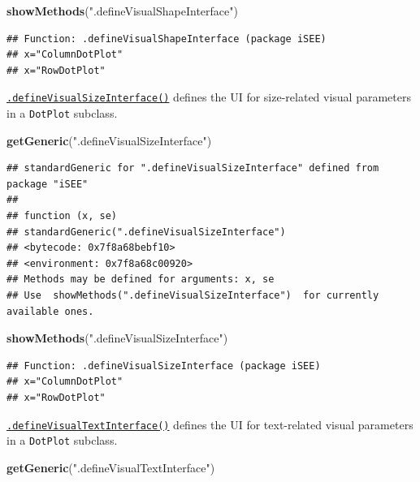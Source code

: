 \documentclass[
]{book}
\newenvironment{Shaded}{\begin{snugshade}}{\end{snugshade}}
\newcommand{\KeywordTok}[1]{\textcolor[rgb]{0.13,0.29,0.53}{\textbf{#1}}}
\newcommand{\NormalTok}[1]{#1}
\newcommand{\StringTok}[1]{\textcolor[rgb]{0.31,0.60,0.02}{#1}}
\begin{document}
\begin{Shaded}
\begin{Highlighting}[]
\KeywordTok{showMethods}\NormalTok{(}\StringTok{".defineVisualShapeInterface"}\NormalTok{)}
\end{Highlighting}
\end{Shaded}

\begin{verbatim}
## Function: .defineVisualShapeInterface (package iSEE)
## x="ColumnDotPlot"
## x="RowDotPlot"
\end{verbatim}

\href{https://isee.github.io/iSEE/reference/visual-parameters-generics.html}{\texttt{.defineVisualSizeInterface()}} defines the UI for size-related visual parameters in a \texttt{DotPlot} subclass.

\begin{Shaded}
\begin{Highlighting}[]
\KeywordTok{getGeneric}\NormalTok{(}\StringTok{".defineVisualSizeInterface"}\NormalTok{)}
\end{Highlighting}
\end{Shaded}

\begin{verbatim}
## standardGeneric for ".defineVisualSizeInterface" defined from package "iSEE"
## 
## function (x, se) 
## standardGeneric(".defineVisualSizeInterface")
## <bytecode: 0x7f8a68bebf10>
## <environment: 0x7f8a68c00920>
## Methods may be defined for arguments: x, se
## Use  showMethods(".defineVisualSizeInterface")  for currently available ones.
\end{verbatim}

\begin{Shaded}
\begin{Highlighting}[]
\KeywordTok{showMethods}\NormalTok{(}\StringTok{".defineVisualSizeInterface"}\NormalTok{)}
\end{Highlighting}
\end{Shaded}

\begin{verbatim}
## Function: .defineVisualSizeInterface (package iSEE)
## x="ColumnDotPlot"
## x="RowDotPlot"
\end{verbatim}

\href{https://isee.github.io/iSEE/reference/visual-parameters-generics.html}{\texttt{.defineVisualTextInterface()}} defines the UI for text-related visual parameters in a \texttt{DotPlot} subclass.

\begin{Shaded}
\begin{Highlighting}[]
\KeywordTok{getGeneric}\NormalTok{(}\StringTok{".defineVisualTextInterface"}\NormalTok{)}
\end{Highlighting}
\end{Shaded}
\end{document}
